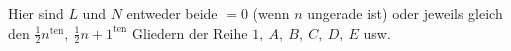 \expandafter\def\csname HistoricalNoteText28\endcsname{Hier sind \(L\) und \(N\) entweder beide \(=0\) (wenn \(n\) ungerade ist) oder jeweils gleich den \(\frac12n^{\mathrm{ten}},\ \frac12n+1^{\mathrm{ten}}\) Gliedern der Reihe
\(1,\ A,\ B,\ C,\ D,\ E\) usw.}
